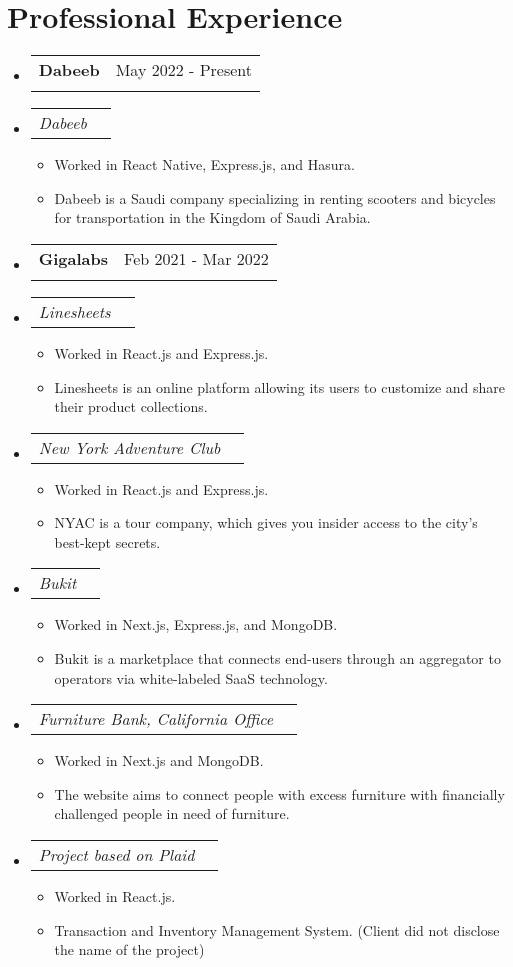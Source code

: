 \documentclass[letterpaper,11pt]{article}
\makeatletter
\newcommand{\resumeItem}[1]{
  \item\small{
    {#1 \vspace{-2pt}}
  }
}
\newcommand{\resumeSubheading}[4]{
  \vspace{-1pt}\item
    \begin{tabular*}{0.97\textwidth}[t]{l@{\extracolsep{\fill}}r}
      \textbf{#1} & #2 \\
      \textit{\small#3} & \textit{\small #4} \\
    \end{tabular*}\vspace{-6pt}
}
\newcommand{\resumeSubSubheading}[2]{
    \item
    \begin{tabular*}{0.97\textwidth}{l@{\extracolsep{\fill}}r}
      \textit{\small#1} & \textit{\small #2} \\
    \end{tabular*}\vspace{-6pt}
}
\newcommand{\resumeProjectHeading}[2]{
    \item
    \begin{tabular*}{0.97\textwidth}{l@{\extracolsep{\fill}}r}
      \small#1 & #2 \\
    \end{tabular*}\vspace{-5pt}
}
\newcommand{\resumeSubHeadingListStart}{\begin{itemize}[leftmargin=0.15in, label={}]}
\newcommand{\resumeSubHeadingListEnd}{\end{itemize}}
\newcommand{\resumeItemListStart}{\begin{itemize}}
\newcommand{\resumeItemListEnd}{\end{itemize}\vspace{-4pt}}
\makeatother
\begin{document}
\section{Professional Experience}
  \resumeSubHeadingListStart
  \resumeSubheading
      {Dabeeb}{May 2022 - Present}{}{}\vspace{-12pt}
      \resumeSubSubheading{Dabeeb}{}
      \resumeItemListStart
        \resumeItem{Worked in React Native, Express.js, and Hasura.}
        \resumeItem{Dabeeb is a Saudi company specializing in renting scooters and bicycles for transportation in the Kingdom of Saudi Arabia.}
    \resumeItemListEnd
    \resumeSubheading
      {Gigalabs}{Feb 2021 - Mar 2022}{}{}\vspace{-12pt}
      \resumeSubSubheading{Linesheets}{}
      \resumeItemListStart
        \resumeItem{Worked in React.js and Express.js.}
        \resumeItem{Linesheets is an online platform allowing its users to customize and share their product collections.}
    \resumeItemListEnd
    \resumeSubSubheading{New York Adventure Club}{}
      \resumeItemListStart
        \resumeItem{Worked in React.js and Express.js.}
        \resumeItem{NYAC is a tour company, which gives you insider access to the city’s best-kept secrets.}
    \resumeItemListEnd
    \resumeSubSubheading{Bukit}{}
      \resumeItemListStart
        \resumeItem{Worked in Next.js, Express.js, and MongoDB.}
        \resumeItem{Bukit is a marketplace that connects end-users through an aggregator to operators via white-labeled SaaS technology.}
    \resumeItemListEnd
    \resumeSubSubheading{Furniture Bank, California Office}{}
      \resumeItemListStart
        \resumeItem{Worked in Next.js and MongoDB.}
        \resumeItem{The website aims to connect people with excess furniture with financially challenged people in need of furniture.}
    \resumeItemListEnd
      \resumeSubSubheading{Project based on Plaid}{}
      \resumeItemListStart
        \resumeItem{Worked in React.js.}
        \resumeItem{Transaction and Inventory Management System. (Client did not disclose the name of the project)}
    \resumeItemListEnd
  \resumeSubHeadingListEnd


\end{document}

